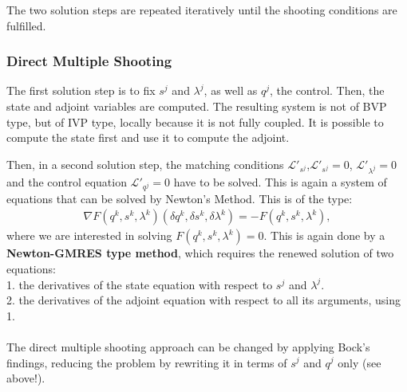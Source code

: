 \documentclass[11pt, a4paper]{article}
\theoremstyle{definition}
\begin{document}
The two solution steps are repeated iteratively until the shooting conditions are fulfilled.

\subsubsection{Direct Multiple Shooting}

The first solution step is to fix $s^j$ and $\lambda^j$, as well as $q^j$, the control.
Then, the state and adjoint variables are computed. The resulting system is not of BVP type, but of IVP type, locally because it is not fully coupled. It is possible to compute the state first and use it to compute the adjoint.


Then, in a second solution step, the matching conditions $\mathcal{L}'_{s^j}$,$\mathcal{L}'_{s^j}=0$, $\mathcal{L}'_{\lambda^j}=0$ and the control equation $\mathcal{L}'_{q^j}=0$ have to be solved. This is again a system of equations that can be solved by Newton's Method.
This is of the type:
\begin{align*}
\nabla F(q^k, s^k,\lambda^k)(\delta q^k,\delta s^k,\delta \lambda^k) = - F(q^k, s^k,\lambda^k),
\end{align*}
where we are interested in solving $F(q^k, s^k,\lambda^k)=0$.
This is again done by a \textbf{Newton-GMRES type method}, which requires the renewed solution of two equations:\\
1. the derivatives of the state equation with respect to $s^j$ and $\lambda^j$.\\
2. the derivatives of the adjoint equation with respect to all its arguments, using 1.\\
\\
The direct multiple shooting approach can be changed by applying Bock's findings, reducing the problem by rewriting it in terms of $s^j$ and $q^j$ only (see above!).
\end{document}
